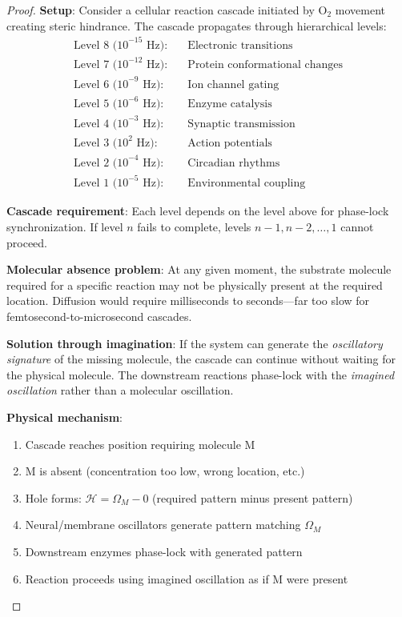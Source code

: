\documentclass[11pt,a4paper]{article}
\begin{document}
\begin{proof}
\textbf{Setup}: Consider a cellular reaction cascade initiated by O$_2$ movement creating steric hindrance. The cascade propagates through hierarchical levels:
\begin{align}
\text{Level 8 (10}^{-15}\text{ Hz):} \quad &\text{Electronic transitions} \\
\text{Level 7 (10}^{-12}\text{ Hz):} \quad &\text{Protein conformational changes} \\
\text{Level 6 (10}^{-9}\text{ Hz):} \quad &\text{Ion channel gating} \\
\text{Level 5 (10}^{-6}\text{ Hz):} \quad &\text{Enzyme catalysis} \\
\text{Level 4 (10}^{-3}\text{ Hz):} \quad &\text{Synaptic transmission} \\
\text{Level 3 (10}^{2}\text{ Hz):} \quad &\text{Action potentials} \\
\text{Level 2 (10}^{-4}\text{ Hz):} \quad &\text{Circadian rhythms} \\
\text{Level 1 (10}^{-5}\text{ Hz):} \quad &\text{Environmental coupling}
\end{align}

\textbf{Cascade requirement}: Each level depends on the level above for phase-lock synchronization. If level $n$ fails to complete, levels $n-1, n-2, \ldots, 1$ cannot proceed.

\textbf{Molecular absence problem}: At any given moment, the substrate molecule required for a specific reaction may not be physically present at the required location. Diffusion would require milliseconds to seconds—far too slow for femtosecond-to-microsecond cascades.

\textbf{Solution through imagination}: If the system can generate the \textit{oscillatory signature} of the missing molecule, the cascade can continue without waiting for the physical molecule. The downstream reactions phase-lock with the \textit{imagined oscillation} rather than a molecular oscillation.

\textbf{Physical mechanism}:
\begin{enumerate}
\item Cascade reaches position requiring molecule M
\item M is absent (concentration too low, wrong location, etc.)
\item Hole forms: $\mathcal{H} = \Omega_M - 0$ (required pattern minus present pattern)
\item Neural/membrane oscillators generate pattern matching $\Omega_M$
\item Downstream enzymes phase-lock with generated pattern
\item Reaction proceeds using imagined oscillation as if M were present
\end{enumerate}


\end{proof}
\end{document}

